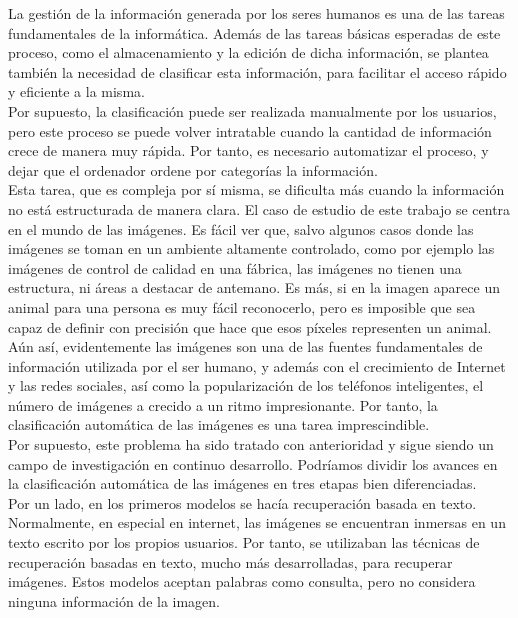 La gestión de la información generada por los seres humanos es una de las tareas fundamentales de la informática. Además de las tareas básicas esperadas de este proceso, como el almacenamiento y la edición de dicha información, se plantea también la necesidad de clasificar esta información, para facilitar el acceso rápido y eficiente a la misma.\\

Por supuesto, la clasificación puede ser realizada manualmente por los usuarios, pero este proceso se puede volver intratable cuando la cantidad de información crece de manera muy rápida. Por tanto, es necesario automatizar el proceso, y dejar que el ordenador ordene por categorías la información.\\

Esta tarea, que es compleja por sí misma, se dificulta más cuando la información no está estructurada de manera clara. El caso de estudio de este trabajo se centra en el mundo de las imágenes. Es fácil ver que, salvo algunos casos donde las imágenes se toman en un ambiente altamente controlado, como por ejemplo las imágenes de control de calidad en una fábrica, las imágenes no tienen una estructura, ni áreas a destacar de antemano. Es más, si en la imagen aparece un animal para una persona es muy fácil reconocerlo, pero es imposible que sea capaz de definir con precisión que hace que esos píxeles representen un animal.\\

Aún así, evidentemente las imágenes son una de las fuentes fundamentales de información utilizada por el ser humano, y además con el crecimiento de Internet y las redes sociales, así como la popularización de los teléfonos inteligentes, el número de imágenes a crecido a un ritmo impresionante. Por tanto, la clasificación automática de las imágenes es una tarea imprescindible.\\

Por supuesto, este problema ha sido tratado con anterioridad y sigue siendo un campo de investigación en continuo desarrollo. Podríamos dividir los avances en la clasificación automática de las imágenes en tres etapas bien diferenciadas.\\

Por un lado, en los primeros modelos se hacía recuperación basada en texto. Normalmente, en especial en internet, las imágenes se encuentran inmersas en un texto escrito por los propios usuarios. Por tanto, se utilizaban las técnicas de recuperación basadas en texto, mucho más desarrolladas, para recuperar imágenes. Estos modelos aceptan palabras como consulta, pero no considera ninguna información de la imagen.

